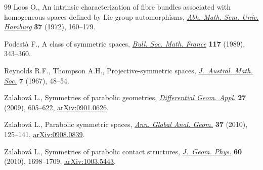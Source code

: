 \begin{thebibliography}{99}
Loos O., An intrinsic characterization of f\/ibre bundles associated with
 homogeneous spaces def\/ined by {L}ie group automorphisms, \href{https://doi.org/10.1007/BF02999694}{\textit{Abh. Math.
 Sem. Univ. Hamburg}} \textbf{37} (1972), 160--179.

Podest\`a F., A class of symmetric spaces, \href{https://doi.org/10.24033/bsmf.2127}{\textit{Bull. Soc. Math. France}}
 \textbf{117} (1989), 343--360.

Reynolds R.F., Thompson A.H., Projective-symmetric spaces, \href{https://doi.org/10.1017/S1446788700005085}{\textit{J.~Austral.
 Math. Soc.}} \textbf{7} (1967), 48--54.

Zalabov\'a L., Symmetries of parabolic geometries, \href{https://doi.org/10.1016/j.difgeo.2009.03.001}{\textit{Differential Geom.
 Appl.}} \textbf{27} (2009), 605--622, \href{http://arxiv.org/abs/0901.0626}{arXiv:0901.0626}.

Zalabov\'a L., Parabolic symmetric spaces, \href{https://doi.org/10.1007/s10455-009-9177-5}{\textit{Ann. Global Anal. Geom.}}
 \textbf{37} (2010), 125--141, \href{http://arxiv.org/abs/0908.0839}{arXiv:0908.0839}.

Zalabov\'a L., Symmetries of parabolic contact structures, \href{https://doi.org/10.1016/j.geomphys.2010.06.013}{\textit{J.~Geom.
 Phys.}} \textbf{60} (2010), 1698--1709, \href{http://arxiv.org/abs/1003.5443}{arXiv:1003.5443}.

\end{thebibliography}
